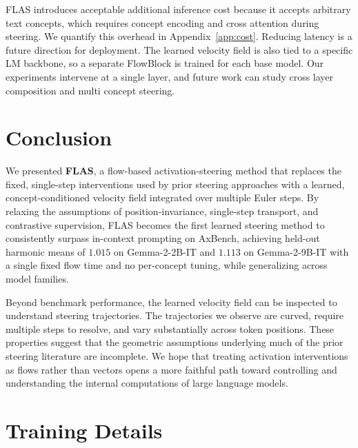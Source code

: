 \documentclass{article}
\begin{document}
FLAS introduces acceptable additional inference cost because it accepts arbitrary text concepts, which requires concept encoding and cross attention during steering. We quantify this overhead in Appendix~\ref{app:cost}. Reducing latency is a future direction for deployment. The learned velocity field is also tied to a specific LM backbone, so a separate FlowBlock is trained for each base model. Our experiments intervene at a single layer, and future work can study cross layer composition and multi concept steering.

\vspace{-0.5em}
\section{Conclusion}
\label{sec:conclusion}

We presented \textbf{FLAS}, a flow-based activation-steering method that replaces the fixed, single-step interventions used by prior steering approaches with a learned, concept-conditioned velocity field integrated over multiple Euler steps. By relaxing the assumptions of position-invariance, single-step transport, and contrastive supervision, FLAS becomes the first learned steering method to consistently surpass in-context prompting on AxBench, achieving held-out harmonic means of $1.015$ on Gemma-2-2B-IT and $1.113$ on Gemma-2-9B-IT with a single fixed flow time and no per-concept tuning, while generalizing across model families.

Beyond benchmark performance, the learned velocity field can be inspected to understand steering trajectories. The trajectories we observe are curved, require multiple steps to resolve, and vary substantially across token positions. These properties suggest that the geometric assumptions underlying much of the prior steering literature are incomplete. We hope that treating activation interventions as flows rather than vectors opens a more faithful path toward controlling and understanding the internal computations of large language models.

\newpage




\newpage
\appendix

\section{Training Details}
\label{app:training}
\end{document}
